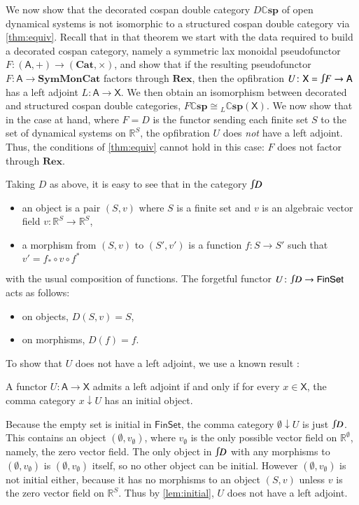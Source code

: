 \documentclass[a4paper,onecolumn, superscriptaddress,10pt, accepted=2022-03-25, issue=SS, volume=VV, shorttitle=papers/compositionality-VV-SS]{compositionalityarticle}
\newcommand{\R}{\mathbb{R}}
\let\maps\colon
\newcommand{\Set}{\mathsf{Set}}
\newcommand{\A}{\mathsf{A}}
\newcommand{\X}{\mathsf{X}}
\newcommand{\Fin}{\mathsf{Fin}}
\newcommand{\bicat}{\mathbf}
\newcommand{\Cat}{\bicat{Cat}}
\newcommand{\Rex}{\bicat{Rex}}
\newcommand{\SMC}{\bicat{SymMonCat}}
\newcommand{\double}[1]{\mathbf{\mathbb #1}}
\newcommand{\lCsp}{\double{Csp}}
\newcommand{\inta}{\raisebox{.3\depth}{$\smallint\hspace{-.01in}$}}
\begin{document}
We now show that the decorated cospan double category $D \lCsp$ of open dynamical systems is not isomorphic to a structured cospan double category via \cref{thm:equiv}. Recall that in that theorem we start with the data required to build a decorated cospan category, namely a symmetric lax monoidal pseudofunctor $F \maps (\A,+) \to (\Cat,\times)$, and show that if the resulting pseudofunctor $F \maps \A \to \SMC$ factors through $\Rex$, then the opfibration $U \maps \X = \inta F \to \A$ has a left adjoint $L \maps \A \to \X$. We then obtain an isomorphism between decorated and structured cospan double categories, $F \lCsp \cong {}_L \lCsp(\X)$. We now show that in the case at hand, where $F = D$ is the functor sending each finite set $S$ to the set of dynamical systems on $\R^S$, the opfibration $U$ does \emph{not} have a left adjoint. Thus, the conditions of \cref{thm:equiv} cannot hold in this case: $F$ does not factor through $\Rex$.

Taking $D$ as above, it is easy to see that in the category $\inta D$
\begin{itemize}
\item an object is a pair $(S,v)$ where $S$ is a finite set and $v$ is an algebraic vector field $v \maps \R^S \to \R^S$,
\item a morphism from $(S,v)$ to $(S',v')$ is a function $f \maps S \to S'$ such that $v' = f_* \circ v \circ f^*$
\end{itemize}
with the usual composition of functions.   The forgetful functor $U \maps \inta D \to \Fin\Set$ acts as follows:
\begin{itemize}
\item on objects, $D(S,v) = S$,
\item on morphisms, $D(f) = f$.
\end{itemize}

To show that $U$ does not have a left adjoint, we use a known result \cite[Lemma 4.6.1]{Riehl}:
\begin{lem} \label{lem:initial}
A functor $U \maps \A \to \X$ admits a left adjoint if and only if for every $x \in \X$, the comma category $x \downarrow U$ has an initial object.
\end{lem}
Because the empty set is initial in $\Fin\Set$, the comma category 
$\emptyset \downarrow U$ is just $\inta D$.  This contains an object $(\emptyset, v_\emptyset)$, where $v_\emptyset$ is the only possible vector field on $\R^\emptyset$, namely, the zero vector field.   The only object in $\inta D$ with any morphisms to $(\emptyset, v_\emptyset)$ is $(\emptyset, v_\emptyset)$ itself, so no other object can be initial.  However $(\emptyset, v_\emptyset)$ is not initial either, because it has no morphisms to an object $(S,v)$ unless $v$ is the zero vector field on $\R^S$.  Thus by \cref{lem:initial}, $U$ does not have a left adjoint.
\end{document}
